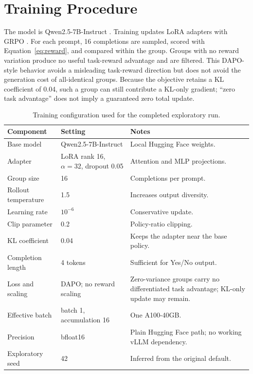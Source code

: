 \documentclass[11pt,letterpaper]{article}
\begin{document}
\section{Training Procedure}

The model is Qwen2.5-7B-Instruct \citep{qwen2024qwen25}. Training updates LoRA
adapters \citep{hu2021lora} with GRPO \citep{shao2024deepseekmath}. For each
prompt, 16 completions are sampled, scored with Equation~\ref{eq:reward}, and
compared within the group. Groups with no reward variation produce no useful
task-reward advantage and are filtered. This DAPO-style behavior
\citep{yu2025dapo} avoids a misleading task-reward direction but does not avoid
the generation cost of all-identical groups. Because the objective retains a
KL coefficient of 0.04, such a group can still contribute a KL-only gradient;
``zero task advantage'' does not imply a guaranteed zero total update.

\begin{table}[htbp]
\centering
\small
\begin{tabular}{L{0.20\textwidth}L{0.31\textwidth}L{0.39\textwidth}}
\toprule
Component & Setting & Notes \\
\midrule
Base model & Qwen2.5-7B-Instruct & Local Hugging Face weights. \\
Adapter & LoRA rank 16, $\alpha=32$, dropout 0.05 & Attention and MLP projections. \\
Group size & 16 & Completions per prompt. \\
Rollout temperature & 1.5 & Increases output diversity. \\
Learning rate & $10^{-6}$ & Conservative update. \\
Clip parameter & 0.2 & Policy-ratio clipping. \\
KL coefficient & 0.04 & Keeps the adapter near the base policy. \\
Completion length & 4 tokens & Sufficient for Yes/No output. \\
Loss and scaling & DAPO; no reward scaling & Zero-variance groups carry no differentiated task advantage; KL-only update may remain. \\
Effective batch & batch 1, accumulation 16 & One A100-40GB. \\
Precision & bfloat16 & Plain Hugging Face path; no working vLLM dependency. \\
Exploratory seed & 42 & Inferred from the original default. \\
\bottomrule
\end{tabular}
\caption{Training configuration used for the completed exploratory run.}
\label{tab:hyperparameters}
\end{table}
\end{document}
